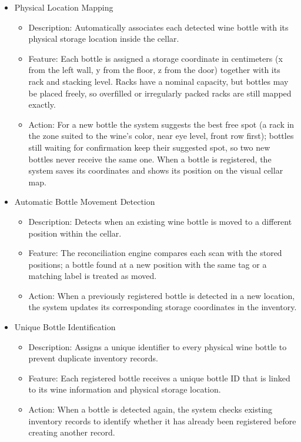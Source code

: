 \documentclass[conference]{IEEEtran}
\begin{document}
\begin{itemize}
    \item Physical Location Mapping
    \begin{itemize}
        \item Description: Automatically associates each detected wine bottle with its physical storage location inside the cellar.
        \item Feature: Each bottle is assigned a storage coordinate in centimeters (x from the left wall, y from the floor, z from the door) together with its rack and stacking level. Racks have a nominal capacity, but bottles may be placed freely, so overfilled or irregularly packed racks are still mapped exactly.
        \item Action: For a new bottle the system suggests the best free spot (a rack in the zone suited to the wine's color, near eye level, front row first); bottles still waiting for confirmation keep their suggested spot, so two new bottles never receive the same one. When a bottle is registered, the system saves its coordinates and shows its position on the visual cellar map.
    \end{itemize}

    \item Automatic Bottle Movement Detection
    \begin{itemize}
        \item Description: Detects when an existing wine bottle is moved to a different position within the cellar.
        \item Feature: The reconciliation engine compares each scan with the stored positions; a bottle found at a new position with the same tag or a matching label is treated as moved.
        \item Action: When a previously registered bottle is detected in a new location, the system updates its corresponding storage coordinates in the inventory.
    \end{itemize}

    \item Unique Bottle Identification
    \begin{itemize}
        \item Description: Assigns a unique identifier to every physical wine bottle to prevent duplicate inventory records.
        \item Feature: Each registered bottle receives a unique bottle ID that is linked to its wine information and physical storage location.
        \item Action: When a bottle is detected again, the system checks existing inventory records to identify whether it has already been registered before creating another record.
    \end{itemize}


\end{itemize}
\end{document}
